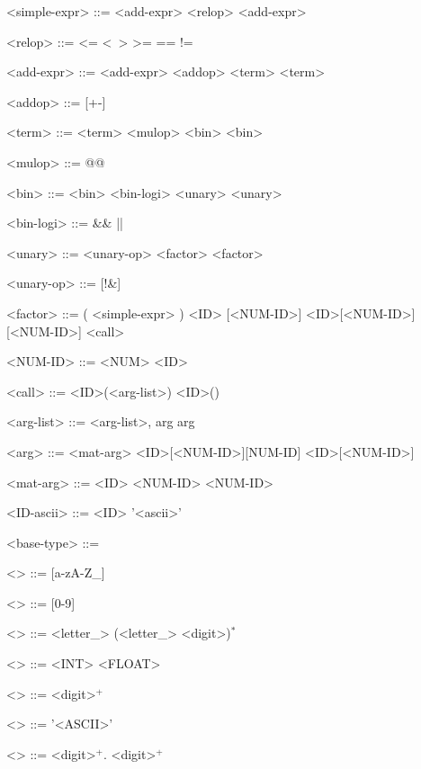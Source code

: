 \begin{grammar}
	<simple-expr> ::= <add-expr> <relop> <add-expr> \alt <add-expr>

	<relop> ::= \textless= \alt \textless\ \alt > \alt >= \alt == \alt !=

	<add-expr> ::= <add-expr> <addop> <term> \alt <term>

	<addop> ::= [+-] 

	<term> ::= <term> <mulop> <bin> \alt <bin>

	<mulop> ::= @@ \alt [*/@]

	<bin> ::= <bin> <bin-logi> <unary> \alt <unary>

	<bin-logi> ::= \&\& \alt ||

	<unary> ::= <unary-op> <factor> \alt <factor> 

	<unary-op> ::= [!\&]

	<factor> ::= ( <simple-expr> ) \alt <NUM-ID> \alt <ID> [<NUM-ID>] \alt <ID>[<NUM-ID>][<NUM-ID>] \alt <call>

	<NUM-ID> ::= <NUM> \alt <ID>

	<call> ::= <ID>(<arg-list>) \alt <ID>()

	<arg-list> ::= <arg-list>, arg \alt arg

	<arg> ::= <mat-arg> \alt <ID>[<NUM-ID>][NUM-ID] \alt <ID>[<NUM-ID>] \alt <NUM-ID> \alt 

	<mat-arg> ::= <ID> <NUM-ID> <NUM-ID>

	<ID-ascii> ::= <ID> \alt '<ascii>'

	<base-type> ::=  \alt {}\alt{}

	<> ::= [a-zA-Z_]
	
	<> ::= [0-9]
	
	<> ::= <letter\_> (<letter\_> \alt <digit>)$^*$
	
	<> ::= <INT> \alt <FLOAT>
	
	<> ::= <digit>$^+$

	<> ::= '<ASCII>'
	
	<> ::= <digit>$^+$. \alt <digit>$^+$

	
\end{grammar}
